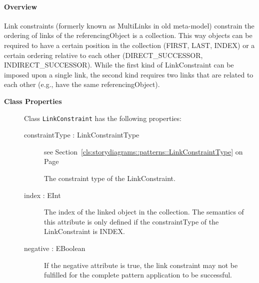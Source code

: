 \paragraph{Overview}

	
			
Link constraints (formerly known as MultiLinks in old meta-model) constrain the ordering of links of the referencingObject is a collection. This way objects can be required to have a certain position in the collection (FIRST, LAST, INDEX) or a certain ordering relative to each other (DIRECT\_SUCCESSOR, INDIRECT\_SUCCESSOR). While the first kind of LinkConstraint can be imposed upon a single link, the second kind requires two links that are related to each other (e.g., have the same referencingObject).	
		
	


\begin{description}

	\item[\textbf{Class Properties}] Class \texttt{LinkConstraint} has the following properties:
	\begin{description}
\item[constraintType : LinkConstraintType 	]
see Section~\ref{cls:storydiagrams::patterns::LinkConstraintType} on Page~\pageref{cls:storydiagrams::patterns::LinkConstraintType}
\hspace{\fill}
\nopagebreak


	
			
The constraint type of the LinkConstraint.	
		
	
\item[index : EInt 	]

\hspace{\fill}
\nopagebreak


	
			
The index of the linked object in the collection. The semantics of this attribute is only defined if the constraintType of the LinkConstraint is INDEX.	
		
	
\item[negative : EBoolean 	]

\hspace{\fill}
\nopagebreak


	
			
If the negative attribute is true, the link constraint may not be fulfilled for the complete pattern application to be successful.	
		
	
	\end{description}
	

\end{description}
